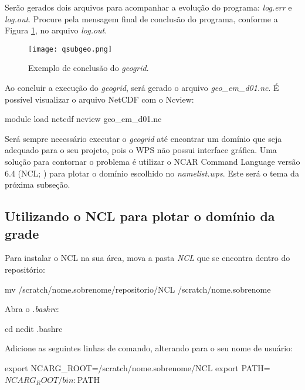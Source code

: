 \noindent Serão gerados dois arquivos para acompanhar a evolução do programa: \textit{log.err} e \textit{log.out}. Procure pela mensagem final de conclusão do programa, conforme a Figura \textcolor{bleu_cite}{\ref{qsubgeofinal}}, no arquivo \textit{log.out}.
\bigskip

\begin{figure}[H]
    \centering
    \texttt{[image: qsubgeo.png]}
    \caption{Exemplo de conclusão do \textit{geogrid}.}
    \label{qsubgeofinal}
\end{figure}
\bigskip

\noindent Ao concluir a execução do \textit{geogrid}, será gerado o arquivo \textit{geo\_em\_d01.nc}. É possível visualizar o arquivo NetCDF com o Ncview:
\bigskip

\begin{bashcode}
module load netcdf
ncview geo_em_d01.nc
\end{bashcode}
\bigskip

\noindent Será sempre necessário executar o \textit{geogrid} até encontrar um domínio que seja adequado para o seu projeto, pois o WPS não possui interface gráfica. Uma solução para contornar o problema é utilizar o NCAR Command Language versão 6.4 (NCL; \cite{Ncl2017}) para plotar o domínio escolhido no \textit{namelist.wps}.  Este será o tema da próxima subseção.
\bigskip

\subsection{Utilizando o NCL para plotar o domínio da grade}
\bigskip

\noindent Para instalar o NCL na sua área, mova a pasta \textit{NCL} que se encontra dentro do repositório:
\bigskip

\begin{bashcode}
mv /scratch/nome.sobrenome/repositorio/NCL /scratch/nome.sobrenome
\end{bashcode}
\bigskip

\noindent Abra o \textit{.bashrc}:
\bigskip

\begin{bashcode}
cd
nedit .bashrc
\end{bashcode}
\bigskip

\noindent Adicione as seguintes linhas de comando, alterando para o seu nome de usuário:
\bigskip

\begin{bashcode}
export NCARG_ROOT=/scratch/nome.sobrenome/NCL
export PATH=$NCARG_ROOT/bin:$PATH
\end{bashcode}
\bigskip

